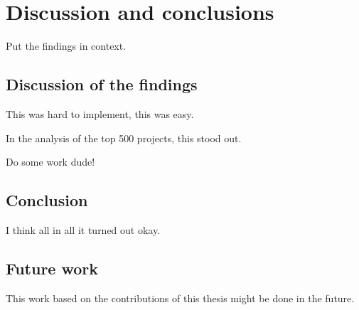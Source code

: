 
\chapter{Discussion and conclusions}\label{ch:conclusions}

Put the findings in context.



\section{Discussion of the findings}\label{sec:discussion}

This was hard to implement, this was easy.

In the analysis of the top 500 projects, this stood out.

Do some work dude!



\section{Conclusion}\label{sec:conclusion}

I think all in all it turned out okay.



\section{Future work}\label{sec:future-work}

This work based on the contributions of this thesis might be done in the future.